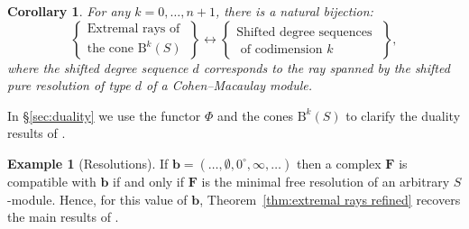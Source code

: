 \documentclass[12pt]{amsart}
\newtheorem{cor}[lemma]{Corollary}
\theoremstyle{definition}
\newtheorem{example}[lemma]{Example}
\theoremstyle{remark}
\newcommand{\bb}{\mathbf{b}}
\newcommand{\FF}{\mathbf{F}}
\newcommand{\zp}{\circ}
\newcommand{\BBQ}{\mathrm{B}}
\begin{document}
\begin{cor}\label{cor:uniform}
For any $k=0,\dots, n+1$, there is a natural bijection:
\[
\left\{
\begin{matrix}
\text{Extremal rays of }\\
\text{the cone } \BBQ^{k}(S)
\end{matrix}
\right\}
\longleftrightarrow
\left\{
\begin{matrix}
\text{Shifted degree sequences }\\
\text{ of codimension $k$}
\end{matrix}
\right\},
\]
where the shifted degree sequence $d$ corresponds to the ray spanned by the shifted pure resolution of type $d$ of a Cohen--Macaulay module. 
\end{cor}
In \S\ref{sec:duality} we use the functor $\Phi$ and the cones $\BBQ^k(S)$ to clarify the duality results of \cite{eis-schrey1}.


\begin{example}[Resolutions]\label{ex:resolutions}
%
If $\bb=(\dots, \emptyset, 0^\zp, \infty, \dots)$ then a complex $\FF$ is compatible with $\bb$ if and only if $\FF$ is the minimal free resolution of an arbitrary $S$-module.  Hence, for this value of $\bb$, Theorem~\ref{thm:extremal rays refined} recovers the main results of \cite{boij-sod2}.
\end{example}
%
%
\end{document}
